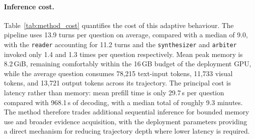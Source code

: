 

\paragraph{Inference cost.} Table~\ref{tab:method_cost} quantifies the cost of this adaptive behaviour. The pipeline uses 13.9 turns per question on average, compared with a median of 9.0, with the \texttt{reader} accounting for 11.2 turns and the \texttt{synthesizer} and \texttt{arbiter} invoked only 1.4 and 1.3 times per question respectively. Mean peak memory is 8.2\,GiB, remaining comfortably within the 16\,GB budget of the deployment GPU, while the average question consumes 78,215 text-input tokens, 11,733 visual tokens, and 13,721 output tokens across its trajectory. The principal cost is latency rather than memory: mean prefill time is only 29.7\,s per question compared with 968.1\,s of decoding, with a median total of roughly 9.3 minutes. The method therefore trades additional sequential inference for bounded memory use and broader evidence acquisition, with the deployment parameters providing a direct mechanism for reducing trajectory depth where lower latency is required.
